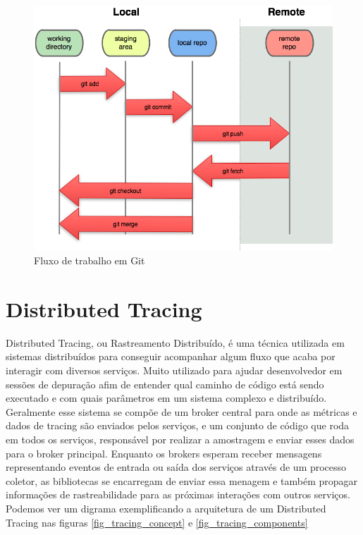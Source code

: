 	\begin{figure}[htb]
		\caption{\label{fig_git2}Fluxo de trabalho em Git}
		\begin{center}
		\includegraphics[scale=1]{pictures/GIT2.png}
		\end{center}
	\end{figure}

	\section{Distributed Tracing}
	
	Distributed Tracing, ou Rastreamento Distribuído, é uma técnica utilizada em sistemas distribuídos para conseguir acompanhar algum fluxo que acaba por interagir com diversos serviços. Muito utilizado para ajudar desenvolvedor em sessões de depuração afim de entender qual caminho de código está sendo executado e com quais parâmetros em um sistema complexo e distribuído. Geralmente esse sistema se compõe de um broker central para onde as métricas e dados de tracing são enviados pelos serviços, e um conjunto de código que roda em todos os serviços, responsável por realizar a amostragem e enviar esses dados para o broker principal. Enquanto os brokers esperam receber mensagens representando eventos de entrada ou saída dos serviços através de um processo coletor, as bibliotecas se encarregam de enviar essa menagem e também propagar informações de rastreabilidade para as próximas interações com outros serviços. Podemos ver um digrama exemplificando a arquitetura de um Distributed Tracing nas figuras \ref{fig_tracing_concept} e \ref{fig_tracing_components}
	
